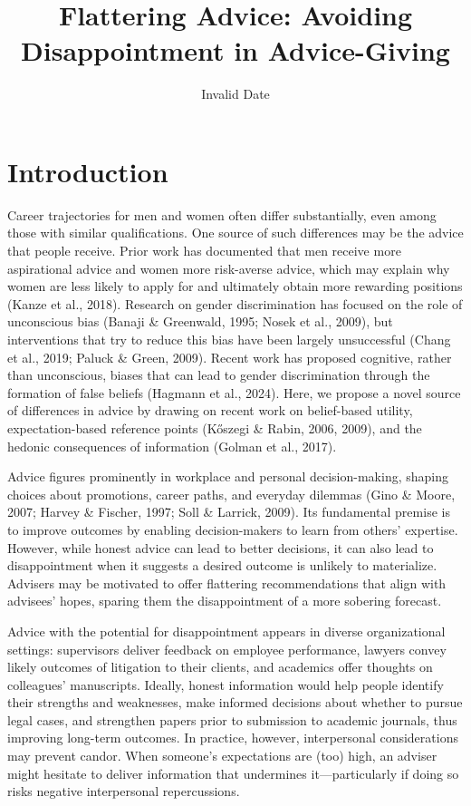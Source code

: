 \documentclass[
  man,
  floatsintext,
  longtable,
  nolmodern,
  notxfonts,
  notimes,
  colorlinks=true,linkcolor=blue,citecolor=blue,urlcolor=blue]{apa7}
\title{Flattering Advice: Avoiding Disappointment in Advice-Giving}
\date{Invalid Date}
\begin{document}
\maketitle


\setcounter{secnumdepth}{-\maxdimen} %

\setlength\LTleft{0pt}


\section{Introduction}\label{introduction}

Career trajectories for men and women often differ substantially, even
among those with similar qualifications. One source of such differences
may be the advice that people receive. Prior work has documented that
men receive more aspirational advice and women more risk-averse advice,
which may explain why women are less likely to apply for and ultimately
obtain more rewarding positions (Kanze et al., 2018). Research on gender
discrimination has focused on the role of unconscious bias (Banaji \&
Greenwald, 1995; Nosek et al., 2009), but interventions that try to
reduce this bias have been largely unsuccessful (Chang et al., 2019;
Paluck \& Green, 2009). Recent work has proposed cognitive, rather than
unconscious, biases that can lead to gender discrimination through the
formation of false beliefs (Hagmann et al., 2024). Here, we propose a
novel source of differences in advice by drawing on recent work on
belief-based utility, expectation-based reference points (Kőszegi \&
Rabin, 2006, 2009), and the hedonic consequences of information (Golman
et al., 2017).

Advice figures prominently in workplace and personal decision-making,
shaping choices about promotions, career paths, and everyday dilemmas
(Gino \& Moore, 2007; Harvey \& Fischer, 1997; Soll \& Larrick, 2009).
Its fundamental premise is to improve outcomes by enabling
decision-makers to learn from others' expertise. However, while honest
advice can lead to better decisions, it can also lead to disappointment
when it suggests a desired outcome is unlikely to materialize. Advisers
may be motivated to offer flattering recommendations that align with
advisees' hopes, sparing them the disappointment of a more sobering
forecast.

Advice with the potential for disappointment appears in diverse
organizational settings: supervisors deliver feedback on employee
performance, lawyers convey likely outcomes of litigation to their
clients, and academics offer thoughts on colleagues' manuscripts.
Ideally, honest information would help people identify their strengths
and weaknesses, make informed decisions about whether to pursue legal
cases, and strengthen papers prior to submission to academic journals,
thus improving long-term outcomes. In practice, however, interpersonal
considerations may prevent candor. When someone's expectations are (too)
high, an adviser might hesitate to deliver information that undermines
it---particularly if doing so risks negative interpersonal
repercussions.
\end{document}
